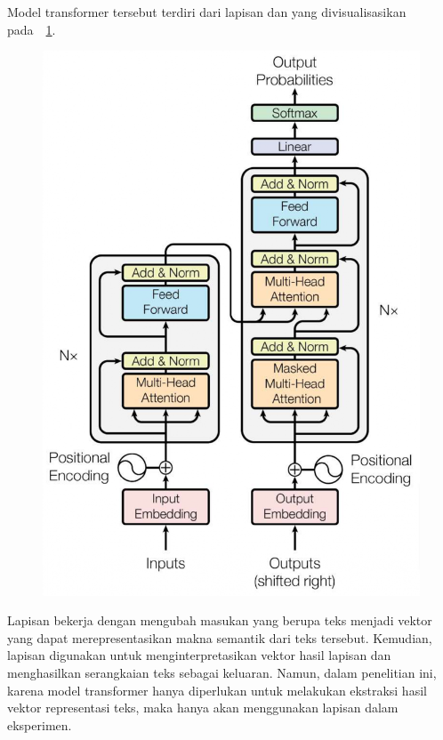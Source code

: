 Model transformer tersebut terdiri dari lapisan \encoder{} dan \decoder{} yang divisualisasikan pada~\gambar{}~\ref{fig:ilustrasi transformer}.
\begin{figure}[!ht]
    \centering
    \includegraphics[scale=0.4]{assets/pdfs/transformer_aristektur.pdf}
    \label{fig:ilustrasi transformer}
\end{figure}
Lapisan \encoder{} bekerja dengan mengubah masukan yang berupa teks menjadi vektor yang dapat merepresentasikan makna semantik dari teks tersebut. Kemudian, lapisan \decoder{} digunakan untuk menginterpretasikan vektor hasil lapisan \encoder{} dan menghasilkan serangkaian teks sebagai keluaran. Namun, dalam penelitian ini, karena model transformer hanya diperlukan untuk melakukan ekstraksi hasil vektor representasi teks, maka hanya akan menggunakan lapisan \encoder{} dalam eksperimen.

